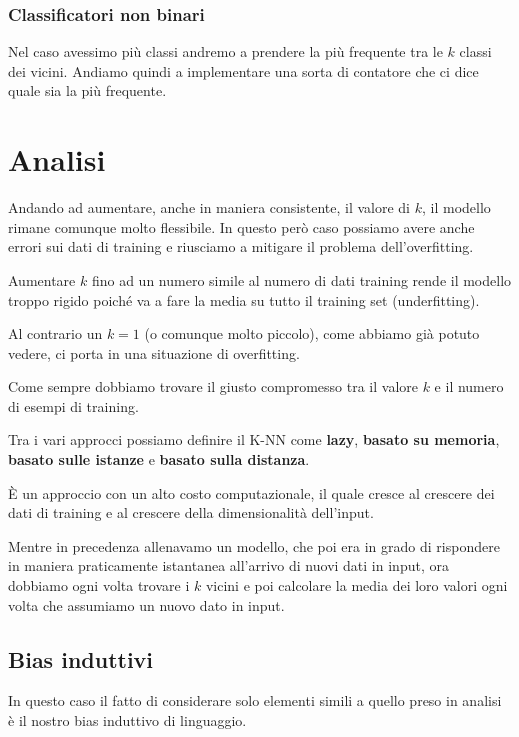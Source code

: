 \subsubsection{Classificatori non binari}
Nel caso avessimo pi\`u classi andremo a prendere la pi\`u frequente tra le $k$ classi dei vicini. Andiamo quindi a
implementare una sorta di contatore che ci dice quale sia la pi\`u frequente.

\section{Analisi}
Andando ad aumentare, anche in maniera consistente, il valore di $k$, il modello rimane comunque molto flessibile.
In questo per\`o caso possiamo avere anche errori sui dati di training e riusciamo a mitigare il problema
dell'overfitting.

Aumentare $k$ fino ad un numero simile al numero di dati training rende il modello troppo rigido poich\'e va a fare la
media su tutto il training set (underfitting).

Al contrario un $k=1$ (o comunque molto piccolo), come abbiamo gi\`a potuto vedere, ci porta in una situazione di
overfitting.

Come sempre dobbiamo trovare il giusto compromesso tra il valore $k$ e il numero di esempi di training.

Tra i vari approcci possiamo definire il K-NN come \textbf{lazy}, \textbf{basato su memoria},
\textbf{basato sulle istanze} e \textbf{basato sulla distanza}.

\`E un approccio con un alto costo computazionale, il quale cresce al crescere dei dati di training e al crescere
della dimensionalit\`a dell'input.

Mentre in precedenza allenavamo un modello, che poi era in grado di rispondere in maniera praticamente istantanea
all'arrivo di nuovi dati in input, ora dobbiamo ogni volta trovare i $k$ vicini e poi calcolare la media dei loro
valori ogni volta che assumiamo un nuovo dato in input.

\subsection{Bias induttivi}
In questo caso il fatto di considerare solo elementi simili a quello preso in analisi \`e il nostro bias induttivo di
linguaggio.